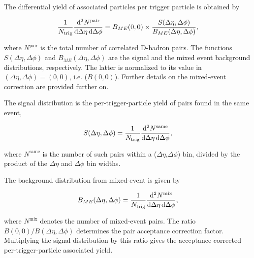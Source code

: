 \begin{enumerate}
The differential yield of associated particles per trigger particle is obtained by
\begin{linenomath}
  \begin{equation}
    \label{2pcorr_incl}
    \frac{1}{N_\text{trig}}\frac{\mathrm{d}^{2}N^\text{pair}}{\mathrm{d}\Delta\eta\, \mathrm{d}\Delta\phi}
= B_{ME}(0,0)\times\frac{S(\Delta\eta,\Delta\phi)}{B_{ME}(\Delta\eta,\Delta\phi)},
\end{equation}
\end{linenomath}
where $N^\text{pair}$ is the total number of correlated D-hadron
pairs. The functions $S(\Delta\eta,\Delta\phi)$ and
$B_{ME}(\Delta\eta,\Delta\phi)$ are the signal and the mixed event
background distributions, respectively. The latter is normalized to its value in
$(\Delta\eta,\Delta\phi)=(0,0)$, i.e. ($B(0,0)$).
Further details on the mixed-event correction are provided further on.

The signal distribution is the per-trigger-particle yield of pairs found in the same event,
\begin{linenomath}
\begin{equation}
\label{eq:signal}
S(\Delta\eta,\Delta\phi) = \frac{1}{N_\text{trig}}\frac{\mathrm{d}^{2}N^\text{same}}{\mathrm{d}\Delta\eta\, \mathrm{d}\Delta\phi},
\end{equation}
\end{linenomath}
where $N^\text{same}$ is the number of such pairs within a ($\Delta\eta$,$\Delta\phi$) bin, divided by the product of the $\Delta\eta$ and $\Delta\phi$ bin widths.

The background distribution from mixed-event is given by
\begin{linenomath}
\begin{equation}
\label{eq:background}
B_{ME}(\Delta\eta,\Delta\phi) = \frac{1}{N_\text{trig}}\frac{\mathrm{d}^{2}N^\text{mix}}{\mathrm{d}\Delta\eta\, \mathrm{d}\Delta\phi},
\end{equation}
\end{linenomath}
where $N^\text{mix}$ denotes the number of
mixed-event pairs.
The ratio $B(0,0)/B(\Delta\eta,\Delta\phi)$
determines the pair acceptance correction
factor. Multiplying the signal distribution by this ratio
gives the acceptance-corrected per-trigger-particle associated
yield.


\end{enumerate}
